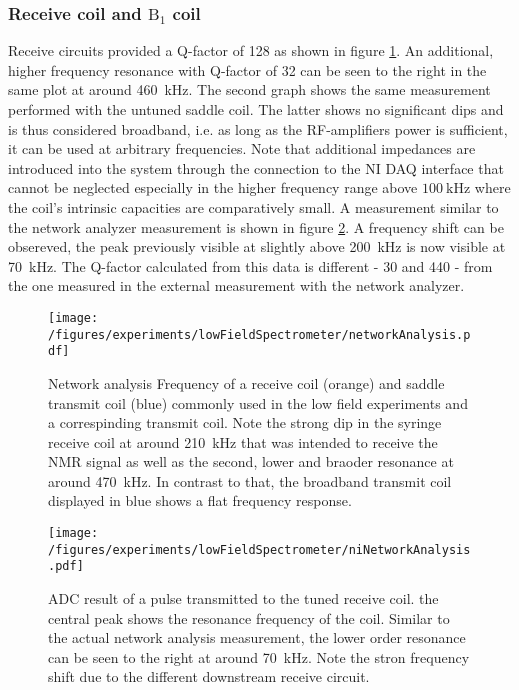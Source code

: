         \subsubsection{Receive coil and $\mathrm{B_1}$ coil}
            Receive circuits provided a Q-factor of 128 as shown in figure \ref{fig:results:networkAnalysis}.  An additional, higher frequency resonance with Q-factor of 32 can be seen to the right in the same plot at around \SI{460}{\kilo Hz}. The second graph shows the same measurement performed with the untuned saddle coil. The latter shows no significant dips and is thus considered broadband, i.e. as long as the RF-amplifiers power is sufficient, it can be used at arbitrary frequencies. Note that additional impedances are introduced into the system through the connection to the NI DAQ interface that cannot be neglected especially in the higher frequency range above $\SI{100}{\kilo\hertz}$ where the coil's intrinsic capacities are comparatively small. A measurement similar to the network analyzer measurement is shown in figure \ref{fig:results:niNetworkAnalysis}. A frequency shift can be obsereved, the peak previously visible at slightly above \SI{200}{\kilo\hertz} is now visible at \SI{70}{\kilo\hertz}. The Q-factor calculated from this data is different - 30 and 440 - from the one measured in the external measurement with the network analyzer.
            \begin{figure}
                \centering
                \texttt{[image: /figures/experiments/lowFieldSpectrometer/networkAnalysis.pdf]}
                \caption[Network analysis receive coil]{Network analysis Frequency of a receive coil (orange) and saddle transmit coil (blue) commonly used in the low field experiments and a correspinding transmit coil. Note the strong dip in the syringe receive coil at around \SI{210}{\kilo\hertz} that was intended to receive the NMR signal as well as the second, lower and braoder resonance at around \SI{470}{\kilo\hertz}. In contrast to that, the broadband transmit coil displayed in blue shows a flat frequency response.}
                \label{fig:results:networkAnalysis}
            \end{figure}
            \begin{figure}
                \texttt{[image: /figures/experiments/lowFieldSpectrometer/niNetworkAnalysis.pdf]}
                \caption[Network analysis NI card]{ADC result of a pulse transmitted to the tuned receive coil. the central peak shows the resonance frequency of the coil. Similar to the actual network analysis measurement, the lower  order resonance can be seen to the right at around \SI{70}{\kilo\hertz}. Note the stron frequency shift due to the different downstream receive circuit.}
                \label{fig:results:niNetworkAnalysis}
            \end{figure}
